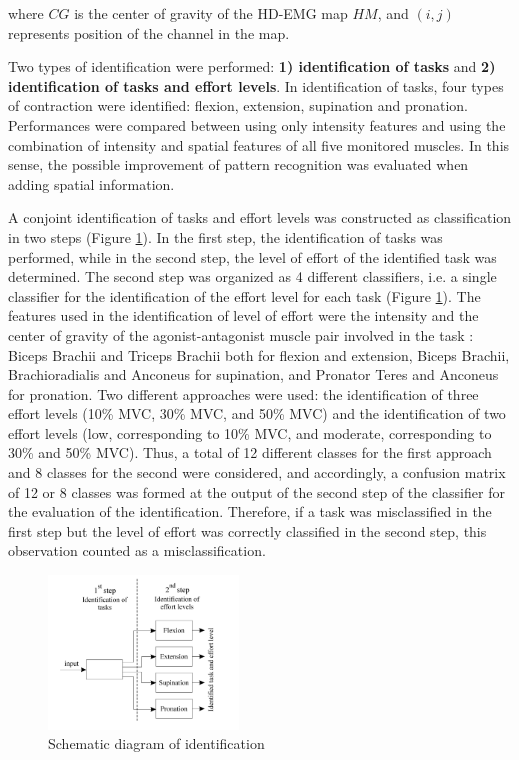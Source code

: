 where $CG$ is the center of gravity of the HD-EMG map $HM$, and $(i,j)$ represents position of the channel in the map.

Two types of identification were performed: \textbf{1) identification of tasks} and \textbf{2) identification of tasks and effort levels}. In identification of tasks, four types of contraction were identified: flexion, extension, supination and pronation. Performances were compared between using only intensity features and using the combination of intensity and spatial features of all five monitored muscles. In this sense, the possible improvement of pattern recognition was evaluated when adding spatial information. 

A conjoint identification of tasks and effort levels was constructed as classification in two steps \citep{Rojas-Martinez2013} (Figure \ref{fig:2-2}). In the first step, the identification of tasks was performed, while in the second step, the level of effort of the identified task was determined. The second step was organized as 4 different classifiers, i.e. a single classifier for the identification of the effort level for each task (Figure \ref{fig:2-2}). The features used in the identification of level of effort were the intensity and the center of gravity of the agonist-antagonist muscle pair involved in the task \citep{Rojas-Martinez2013}: Biceps Brachii and Triceps Brachii both for flexion and extension, Biceps Brachii, Brachioradialis and Anconeus for supination, and Pronator Teres and Anconeus for pronation. Two different approaches were used: the identification of three effort levels (10\% MVC, 30\% MVC, and 50\% MVC) and the identification of two effort levels (low, corresponding to 10\% MVC, and moderate, corresponding to 30\% and 50\% MVC). Thus, a total of 12 different classes for the first approach and 8 classes for the second were considered, and accordingly, a confusion matrix of 12 or 8 classes was formed at the output of the second step of the classifier for the evaluation of the identification. Therefore, if a task was misclassified in the first step but the level of effort was correctly classified in the second step, this observation counted as a misclassification.

\begin{figure}[ht]
\centering
\includegraphics[width=0.45\textwidth]{Images/figure2_2.png}
\caption{Schematic diagram of identification}
\label{fig:2-2}
\end{figure}     

